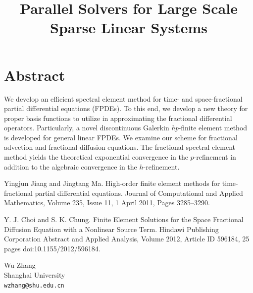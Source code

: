 \documentclass[article,A4,11pt]{llncs}%
\begin{document}
\section*{Abstract}
We develop an efficient spectral element method for time- and space-fractional partial differential equations (FPDEs). To this end, we develop a new theory for proper basis functions to utilize in approximating the fractional differential operators. Particularly, a novel discontinuous Galerkin \textit{hp}-finite element method is developed for general linear FPDEs. We examine our scheme for fractional advection and fractional diffusion equations. The fractional spectral element method yields the theoretical exponential convergence in the $p$-refinement in addition to the algebraic convergence in the $h$-refinement. 


\begin{thebibliography}{10}
{\sc Yingjun Jiang and Jingtang Ma}. {High-order finite element methods for time-fractional partial differential equations}. Journal of Computational and Applied Mathematics, Volume 235, Issue 11, 1 April 2011, Pages 3285–3290.

{\sc Y. J. Choi and S. K. Chung}. {Finite Element Solutions for the Space Fractional Diffusion Equation with a Nonlinear Source Term}. Hindawi Publishing Corporation Abstract and Applied Analysis, Volume 2012, Article ID 596184, 25 pages doi:10.1155/2012/596184.
\end{thebibliography}

\title{Parallel Solvers for Large Scale Sparse Linear Systems}
 \author{} \institute{}
\maketitle
\begin{center}
{\large Wu Zhang}\\
Shanghai University\\
{\tt wzhang@shu.edu.cn}
\end{center}
\end{document}
